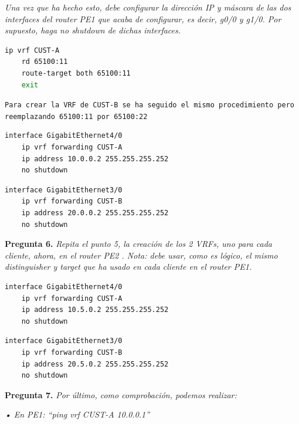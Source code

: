 \documentclass[a4paper, 12pt]{report}
\begin{document}
\textit{Una vez que ha hecho esto, debe configurar la dirección IP y máscara de las dos
interfaces del router PE1 que acaba de configurar, es decir, g0/0 y g1/0. Por supuesto,
haga no shutdown de dichas interfaces.
}

\begin{lstlisting}[language=bash, caption={Comandos utilizados para crear la VRF CUST-A de PE1}]
    ip vrf CUST-A
	rd 65100:11
	route-target both 65100:11
	exit
\end{lstlisting}

\texttt{Para crear la VRF de CUST-B se ha seguido el mismo procedimiento pero reemplazando 65100:11 por 65100:22}

\begin{lstlisting}[language=bash, caption={Comandos utilizados para asignar la VRF CUST-A a la interfaz correspondiente en PE1}]
	interface GigabitEthernet4/0
	ip vrf forwarding CUST-A
	ip address 10.0.0.2 255.255.255.252
	no shutdown
\end{lstlisting}

\begin{lstlisting}[language=bash, caption={Comandos utilizados para asignar la VRF CUST-B a la interfaz correspondiente en PE1}]
	interface GigabitEthernet3/0
	ip vrf forwarding CUST-B
	ip address 20.0.0.2 255.255.255.252
	no shutdown
\end{lstlisting}

\textbf{Pregunta 6.}
\textit{Repita el punto 5, la creación de los 2 VRFs, uno para cada cliente, ahora, en el
router PE2 . Nota: debe usar, como es lógico, el mismo distinguisher y target que ha usado en
cada cliente en el router PE1.}

\begin{lstlisting}[language=bash, caption={Comandos utilizados para asignar la VRF CUST-A a la interfaz correspondiente en PE1}]
	interface GigabitEthernet4/0
	ip vrf forwarding CUST-A
	ip address 10.5.0.2 255.255.255.252
	no shutdown
\end{lstlisting}

\begin{lstlisting}[language=bash, caption={Comandos utilizados para asignar la VRF CUST-B a la interfaz correspondiente en PE1}]
	interface GigabitEthernet3/0
	ip vrf forwarding CUST-B
	ip address 20.5.0.2 255.255.255.252
	no shutdown
\end{lstlisting}
\textbf{Pregunta 7.}
\textit{Por último, como comprobación, podemos realizar:}

\textit{• En PE1: “ping vrf CUST-A 10.0.0.1”}
\end{document}
